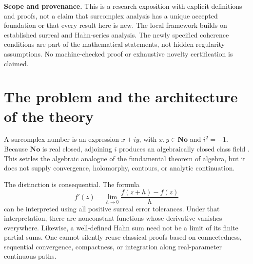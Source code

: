 \documentclass[11pt,letterpaper]{article}
\theoremstyle{definition}
\theoremstyle{remark}
\newcommand{\No}{\mathbf{No}}
\numberwithin{equation}{section}
\begin{document}
\begin{titlepage}
\begin{minipage}{0.91\textwidth}
\begin{abstract}
Third, we examine genuinely global extensions. Explicit global fine-analytic exponentials and a global fine-analytic logarithm demonstrate the failure of classical uniqueness and topological obstruction arguments. Conversely, entire functions admitting uniform Hahn-holomorphic descriptions at \emph{every} surreal scale are precisely polynomials, and the corresponding meromorphic functions are rational. The resulting theory is substantial but deliberately stratified: its hypotheses identify exactly which version of each classical theorem survives.
\end{abstract}
\end{minipage}
\vfill
\begin{minipage}{0.91\textwidth}\small
\textbf{Scope and provenance.} This is a research exposition with explicit definitions and proofs, not a claim that surcomplex analysis has a unique accepted foundation or that every result here is new. The local framework builds on established surreal and Hahn-series analysis. The newly specified coherence conditions are part of the mathematical statements, not hidden regularity assumptions. No machine-checked proof or exhaustive novelty certification is claimed.
\end{minipage}
\end{titlepage}
\tableofcontents
\newpage

\section{The problem and the architecture of the theory}\label{sec:intro}
A surcomplex number is an expression $x+iy$, with $x,y\in\No$ and $i^2=-1$. Because $\No$ is real closed, adjoining $i$ produces an algebraically closed class field \cite{Conway,Gonshor}. This settles the algebraic analogue of the fundamental theorem of algebra, but it does not supply convergence, holomorphy, contours, or analytic continuation.

The distinction is consequential. The formula
\[
 f'(z)=\lim_{h\to0}\frac{f(z+h)-f(z)}h
\]
can be interpreted using all positive surreal error tolerances. Under that interpretation, there are nonconstant functions whose derivative vanishes everywhere. Likewise, a well-defined Hahn sum need not be a limit of its finite partial sums. One cannot silently reuse classical proofs based on connectedness, sequential convergence, compactness, or integration along real-parameter continuous paths.
\end{document}
